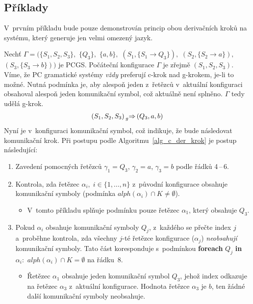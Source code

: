 \subsection*{Příklady}
V~prvním příkladu bude pouze demonstrován princip obou derivačních kroků na systému, který generuje jen velmi omezený jazyk.
\begin{example}
    Nechť $\Gamma = (\{S_1, S_2, S_3\},$ $\{Q_3\},$ $\{a, b\},$ $(S_1, \{S_1 \rightarrow Q_3\}),$ $(S_2, \{S_2 \rightarrow a\}),$ $(S_3, \{S_3 \rightarrow b\}))$ je PCGS.
    Počáteční konfigurace $\Gamma$ je zřejmě $(S_1, S_2, S_3)$.
    Víme, že PC gramatické systémy \emph{vždy} preferují c-krok nad g-krokem, je-li to možné.
    Nutná podmínka je, aby alespoň jeden z~řetězců v~aktuální konfiguraci obsahoval alespoň jeden komunikační symbol, což aktuálně není splněno.
    $\Gamma$ tedy udělá g-krok.
     \begin{equation*}
    (S_1, S_2, S_3) \prescript{}{g}{\Rightarrow}\, (Q_3, a, b)
     \end{equation*}
     Nyní je v~konfiguraci komunikační symbol, což indikuje, že bude následovat komunikační krok.
     Při postupu podle Algoritmu~\ref{alg_c_der_krok} je postup následující:
     \begin{enumerate}
        \item Zavedení pomocných řetězců $\gamma_1 = Q_3$, $\gamma_2 = a$, $\gamma_3 = b$ podle řádků 4\,--\,6.
        \item Kontrola, zda řetězec $\alpha_i,\; i \in \{1, \ldots, n\}$ z~původní konfigurace obsahuje komunikační symboly (podmínka $alph(\alpha_i) \cap K \neq \emptyset$).
        \begin{itemize}[label=$\circ$]
            \item V~tomto příkladu splňuje podmínku pouze řetězec $\alpha_1$, který obsahuje $Q_3$.
        \end{itemize}
        \item Pokud $\alpha_i$ obsahuje komunikační symboly $Q_j$, z~každého se přečte index $j$ a~proběhne kontrola, zda všechny $j$-té řetězce konfigurace ($\alpha_j$) \emph{neobsahují} komunikační symboly.
        Tato část koresponduje s~podmínkou \textbf{foreach} $Q_j$ \textbf{in} $\alpha_i:$ $alph(\alpha_i) \cap K = \emptyset$ na řádku~8.
        \begin{itemize}[label=$\circ$]
            \item Řetězec $\alpha_1$ obsahuje jeden komunikační symbol $Q_3$, jehož index odkazuje na řetězec $\alpha_3$ z~aktuální konfigurace.
            Hodnota řetězce $\alpha_3$ je $b$, ten žádné další komunikační symboly neobsahuje.

\end{itemize}
\end{enumerate}
\end{example}
